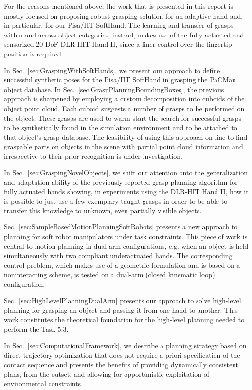 \documentclass[a4paper,11pt,pdf]{pacmanreport}
\begin{document}
For the reasons mentioned above, the work that is presented in this report is mostly focused on proposing robust grasping solution for an adaptive hand and, in particular, for our Pisa/IIT SoftHand. The learning and transfer of grasps within and across object categories, instead, makes use of the fully actuated and sensorized 20-DoF DLR-HIT Hand II, since a finer control over the fingertip position is required.

In Sec.~\ref{sec:GraspingWithSoftHands}, we present our approach to define successful synthetic poses for the Pisa/IIT SoftHand in grasping the PaCMan object database. In Sec.~\ref{sec:GraspPlanningBoundingBoxes}, the previous approach is sharpened by employing a custom decomposition into cuboids of the object point cloud. Each cuboid suggests a number of grasps to be performed on the object. These grasps are used to warm start the search for successful grasps to be synthetically found in the simulation environment and to be attached to that object's grasp database. The feasibility of using this approach on-line to find graspable parts on objects in the scene with partial point cloud information and irrespective to their prior recognition is under investigation.

In Sec.~\ref{sec:GraspingNovelObjects}, we shift our attention onto the generalization and adaptation ability of the previously reported grasp planning algorithm for fully actuated hands showing, in experiments using the DLR-HIT Hand II, how it is possible to just use a few exemplary taught grasps in order to be able to transfer this knowledge to unknown, even partially visible objects.

Sec.~\ref{sec:SampleBasedMotionPlanningSoftRobots} presents a new approach to planning for soft robot manipulators under task constraints. This piece of work is central to motion planning in dual arm configurations, e.g. when an object is held simultaneously with two compliant underactuated hands. The corresponding control problem, which makes use of a geometric formulation and is based on a noninteracting scheme, is tested on a dual-arm (closed kinematic loop) configuration.

Sec.~\ref{sec:HighLevelPlanningDualArm} presents our approach to solve high-level planning for grasping an object and passing it from one hand to another. This work constitutes the theoretical foundation for the high-level planning needed to perform the Task 5.3.

In Sec.~\ref{sec:ComputationalFramework}, we describe a planning strategy based on direct trajectory optimization that does not require a-priori specification of the contact sequence and presents the benefits of providing dynamically consistent plans, from the outset, and allowing for opportunistic exploitation of environmental constraints. 
\end{document}
